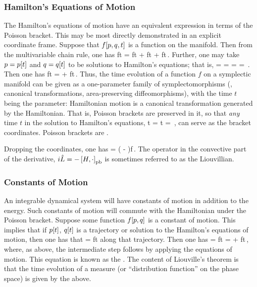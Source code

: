 \subsubsection{Hamilton's Equations of Motion}
The Hamilton's equations of motion have an equivalent expression in terms of the Poisson bracket. This may be most directly demonstrated in an explicit coordinate frame. Suppose that $f\!\left[{p, q, t}\right]$ is a function on the manifold. Then from the multivariable chain rule, one has
\beq
\xod ft = \xpd f\lmom \xod\lmom t + \xpd f\gpvec \xod\gpvec t + \xpd ft\,.
\eeq
Further, one may take $p = p\!\left[{t}\right]$ and $q = q\!\left[{t}\right]$ to be solutions to Hamilton's equations; that is,
\beq
\dt\gpvec = \xpd\ham\lmom  = \poisson{\gpvec, \ham}\qquad{}\qquad
\dt\lmom  = \xpd\ham\gpvec = \poisson{\gmom, \ham}\,.
\eeq
Then one has
\beq
\xod ft =  + \xpd ft\,.
\eeq
Thus, the time evolution of a function $f$ on a symplectic manifold can be given as a one-parameter family of symplectomorphisms (\ie, canonical transformations, area-preserving diffeomorphisms), with the time $t$ being the parameter: Hamiltonian motion is a canonical transformation generated by the Hamiltonian. That is, Poisson brackets are preserved in it, so that \emph{any} time $t$ in the solution to Hamilton's equations, 
\beq
\gpvec\vat t = \gpvec{}\qquad{}\qquad
\lmom\vat t  = \lmom{}\,,
\eeq
can serve as the bracket coordinates. Poisson brackets are .

Dropping the coordinates, one has
\beq
{} = \left(  - \poisson{\ham, \cdot} \right)f\,.
\eeq
The operator in the convective part of the derivative, $i\hat{L} = -\left[{H, \cdot}\right]_{\text{pb}}$ is sometimes referred to as the Liouvillian.


\subsubsection{Constants of Motion}
An integrable dynamical system will have constants of motion in addition to the energy. Such constants of motion will commute with the Hamiltonian under the Poisson bracket. Suppose some function $f\!\left[{p,q}\right]$ is a constant of motion. This implies that if $p\!\left[{t}\right]$, $q\!\left[{t}\right]$ is a trajectory or solution to the Hamilton's equations of motion, then one has that
 = \xod ft
\eeq
along that trajectory. Then one has
 = \xod ft\vat{\lmom,\gpvec} =  + \xpd ft\,,
\eeq
where, as above, the intermediate step follows by applying the equations of motion. This equation is known as the . The content of Liouville's theorem is that the time evolution of a measure (or ``distribution function'' on the phase space) is given by the above.

